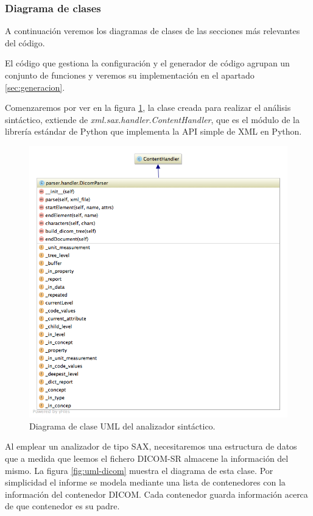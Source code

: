\subsubsection{Diagrama de clases}
A continuación veremos los diagramas de clases de las secciones más relevantes del código.\par
El código que gestiona la configuración y el generador de código agrupan un conjunto de funciones y veremos su implementación en el apartado \ref{sec:generacion}.\par
Comenzaremos por ver en la figura \ref{fig:uml-parser}, la clase creada para realizar el análisis sintáctico, extiende de \emph{xml.sax.handler.ContentHandler}, que es el módulo de la librería estándar de Python que implementa la API simple de XML en Python. \par

\begin{figure}[ht]
\centering
\includegraphics[scale=0.6]{./imgs/diagramasUML/parser.png}
\caption{Diagrama de clase UML del analizador sintáctico.}
\label{fig:uml-parser}
\end{figure}

Al emplear un analizador de tipo SAX, necesitaremos una estructura de datos que a medida que leemos el fichero DICOM-SR almacene la información del mismo. La figura \ref{fig:uml-dicom} muestra el diagrama de esta clase. Por simplicidad el informe se modela mediante una lista de contenedores con la información del contenedor DICOM. Cada contenedor guarda información acerca de que contenedor es su padre. \par

